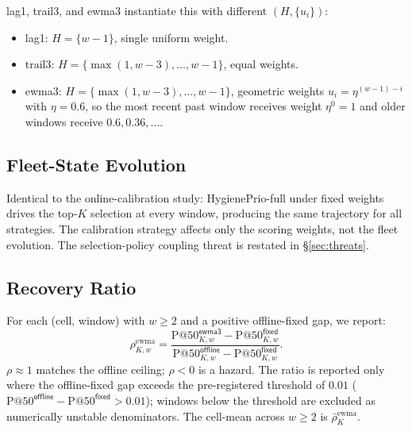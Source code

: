 \textsf{lag1}, \textsf{trail3}, and \textsf{ewma3} instantiate this
with different $(H, \{u_i\})$:

\begin{itemize}
\item \textsf{lag1}: $H = \{w-1\}$, single uniform weight.
\item \textsf{trail3}: $H = \{\max(1, w-3), \ldots, w-1\}$, equal weights.
\item \textsf{ewma3}: $H = \{\max(1, w-3), \ldots, w-1\}$, geometric
weights $u_i = \eta^{(w-1)-i}$ with $\eta = 0.6$, so the most recent
past window receives weight $\eta^0 = 1$ and older windows receive
$0.6, 0.36, \ldots$.
\end{itemize}

\subsection{Fleet-State Evolution}

Identical to the online-calibration study: HygienePrio-full under \textsf{fixed} weights
drives the top-$K$ selection at every window, producing the same
trajectory for all strategies. The calibration strategy affects only
the scoring weights, not the fleet evolution. The selection-policy
coupling threat is restated in \S\ref{sec:threats}.

\subsection{Recovery Ratio}

For each (cell, window) with $w \geq 2$ and a positive offline-fixed
gap, we report:
\begin{equation}
\rho_{K, w}^{\text{ewma}} =
\frac{\text{P@50}^{\textsf{ewma3}}_{K, w} - \text{P@50}^{\textsf{fixed}}_{K, w}}
 {\text{P@50}^{\textsf{offline}}_{K, w} - \text{P@50}^{\textsf{fixed}}_{K, w}}.
\end{equation}
$\rho \approx 1$ matches the offline ceiling; $\rho < 0$ is a hazard.
The ratio is reported only where the offline-fixed gap exceeds the
pre-registered threshold of $0.01$
($\text{P@50}^{\textsf{offline}} - \text{P@50}^{\textsf{fixed}} > 0.01$);
windows below the threshold are excluded as numerically unstable
denominators. The cell-mean across $w \geq 2$ is
$\bar\rho_K^{\text{ewma}}$.
